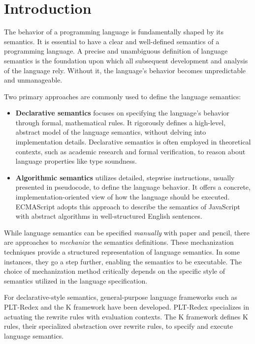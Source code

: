 \section{Introduction}\label{sec:intro}
The behavior of a programming language is fundamentally shaped by its semantics. It is essential to have a clear and well-defined semantics of a programming language. A precise and unambiguous definition of language semantics is the foundation upon which all subsequent development and analysis of the language rely. Without it, the language’s behavior becomes unpredictable and unmanageable.

Two primary approaches are commonly used to define the language semantics:
\begin{itemize}
\item \textbf{Declarative semantics} focuses on specifying the language’s behavior through formal, mathematical rules. It rigorously defines a high-level, abstract model of the language semantics, without delving into implementation details. Declarative semantics is often employed in theoretical contexts, such as academic research and formal verification, to reason about language properties like type soundness.
\item \textbf{Algorithmic semantics} utilizes detailed, stepwise instructions, usually presented in pseudocode, to define the language behavior. It offers a concrete, implementation-oriented view of how the language should be executed. ECMAScript adopts this approach to describe the semantics of JavaScript with abstract algorithms in well-structured English sentences.
\end{itemize}

While language semantics can be specified \textit{manually} with paper and pencil, there are approaches to \textit{mechanize} the semantics definitions. These mechanization techniques provide a structured representation of language semantics. In some instances, they go a step further, enabling the semantics to be executable. The choice of mechanization method critically depends on the specific style of semantics utilized in the language specification.

For declarative-style semantics, general-purpose language frameworks such as PLT-Redex and the K framework have been developed. PLT-Redex specializes in actuating the rewrite rules with evaluation contexts. The K framework defines K rules, their specialized abstraction over rewrite rules, to specify and execute language semantics.

